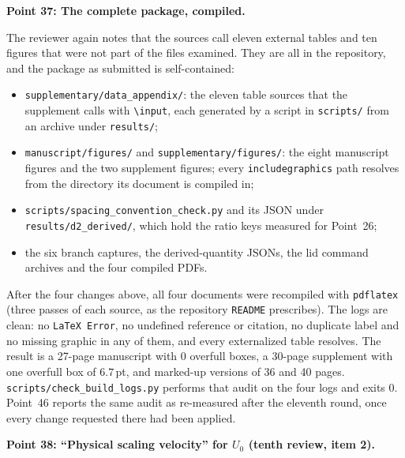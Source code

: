 \documentclass[11pt,a4paper]{article}
\begin{document}
\vspace{1em}

\noindent\textbf{Point 37: The complete package, compiled.}

The reviewer again notes that the sources call eleven external tables and ten figures
that were not part of the files examined. They are all in the repository, and the
package as submitted is self-contained:
\begin{itemize}
\item \texttt{supplementary/data\_appendix/}: the eleven table sources that the
  supplement calls with \texttt{\textbackslash input}, each generated by a script in
  \texttt{scripts/} from an archive under
  \texttt{results/};
\item \texttt{manuscript/figures/} and \texttt{supplementary/figures/}: the eight
  manuscript figures and the two supplement figures; every \texttt{includegraphics}
  path resolves from the directory its document is compiled in;
\item \texttt{scripts/}\hspace{0pt}\texttt{spacing\_convention\_check.py} and its JSON
  under \texttt{results/d2\_derived/}, which hold the ratio keys measured for
  Point~26;
\item the six branch captures, the derived-quantity JSONs, the lid command archives and
  the four compiled PDFs.
\end{itemize}
After the four changes above, all four documents were recompiled with \texttt{pdflatex}
(three passes of each source, as the repository \texttt{README} prescribes). The logs
are clean: no \texttt{LaTeX Error}, no undefined reference or citation, no duplicate
label and no missing graphic in any of them, and every externalized table resolves. The
result is a 27-page manuscript with 0 overfull boxes, a 30-page supplement with one
overfull box of $6.7$\,pt, and marked-up versions of 36 and 40 pages.
\texttt{scripts/check\_build\_logs.py} performs that audit on the four logs and exits 0.
Point~46 reports the same audit as re-measured after the eleventh round, once every
change requested there had been applied.

\vspace{1em}

\noindent\textbf{Point 38: ``Physical scaling velocity'' for $U_0$ (tenth review, item 2).}
\end{document}
